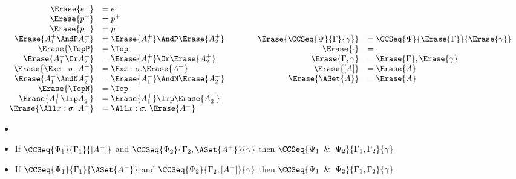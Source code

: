 \begin{definition}[Erasure]
  \[
  \begin{array}{cc}
    \begin{array}{rl}
      \Erase{e^+}&=e^+\\
      \Erase{p^+}&=p^+\\
      \Erase{p^-}&=p^-\\
      \Erase{A_1^+\AndP A_2^+} &= \Erase{A_1^+}\AndP\Erase{A_2^+} \\
      \Erase{\TopP} &= \Top \\
      \Erase{A_1^+\Or A_2^+} &= \Erase{A_1^+}\Or\Erase{A_2^+} \\
      \Erase{\Ex x:\sigma.~A^+} &= \Ex x:\sigma.\Erase{A^+}\\
      \Erase{A_1^-\AndN A_2^-} &= \Erase{A_1^-}\AndN\Erase{A_2^-} \\
      \Erase{\TopN} &= \Top \\
      \Erase{A_1^+\Imp A_2^-} &= \Erase{A_1^+}\Imp\Erase{A_2^-} \\
      \Erase{\All x:\sigma.~A^-} &= \All x:\sigma.~\Erase{A^-}\\
    \end{array}
    &
    \hspace{2em}
    \begin{array}{rl}
      \Erase{\CCSeq{\Psi}{\Gamma}{\gamma}}&=\CCSeq{\Psi}{\Erase{\Gamma}}{\Erase{\gamma}} \\
      \Erase{\cdot}&=\cdot\\
      \Erase{\Gamma,\gamma}&=\Erase{\Gamma},\Erase{\gamma}\\
      \Erase{[A]}&=\Erase{A}\\
      \Erase{\ASet{A}}&=\Erase{A}\\
    \end{array}
  \end{array}
  \]
\end{definition}



\begin{theorem}
  \begin{itemize}
  \item[]
  \item If $\CCSeq{\Psi_1}{\Gamma_1}{[A^+]}$ and $\CCSeq{\Psi_2}{\Gamma_2,\ASet{A^+}}{\gamma}$
    then $\CCSeq{\Psi_1\And\Psi_2}{\Gamma_1,\Gamma_2}{\gamma}$
  \item If $\CCSeq{\Psi_1}{\Gamma_1}{\ASet{A^-}}$ and $\CCSeq{\Psi_2}{\Gamma_2,[A^-]}{\gamma}$
    then $\CCSeq{\Psi_1\And\Psi_2}{\Gamma_1,\Gamma_2}{\gamma}$
  \end{itemize}
\end{theorem}

